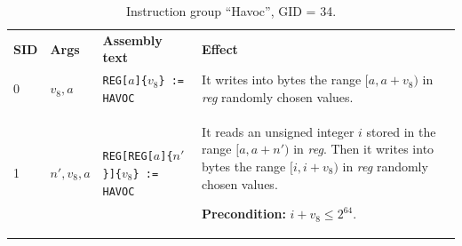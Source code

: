 \documentclass[10pt,twocolumn]{article}
\begin{document}


\begin{table}[!h]
\begin{center}
\def\arraystretch{1.5}
\begin{tabular}{lp{1.2cm}p{5.5cm}p{7.5cm}}
\textbf{SID} & \textbf{Args} & \textbf{Assembly text} & \textbf{Effect}
\\

0 & $ v_8,a $ %
& \texttt{REG[}$ a $\texttt{]\{}$ v_8 $\texttt{\} := HAVOC} %
& It writes into bytes the range $ [a,a+v_8) $ in \textit{reg} randomly chosen
values. \\

1 & $ n',v_8,a $ %
& \texttt{REG[REG[}$ a $\texttt{]\{}$ n' $\texttt{\}]\{}$ v_8 $\texttt{\} :=
HAVOC} %
& It reads an unsigned integer $ i $ stored in the range $ [a,a+n') $ in
\textit{reg}. Then it writes into bytes the range $ [i,i+v_8) $ in \textit{reg}
randomly chosen values.

\textbf{Precondition:} $ i + v_8 \leq 2^{64} $. \\


\end{tabular}
\end{center}
\caption{Instruction group ``Havoc'', GID = 34.}
\label{tab:igroup:havoc}
\end{table}

\end{document}
